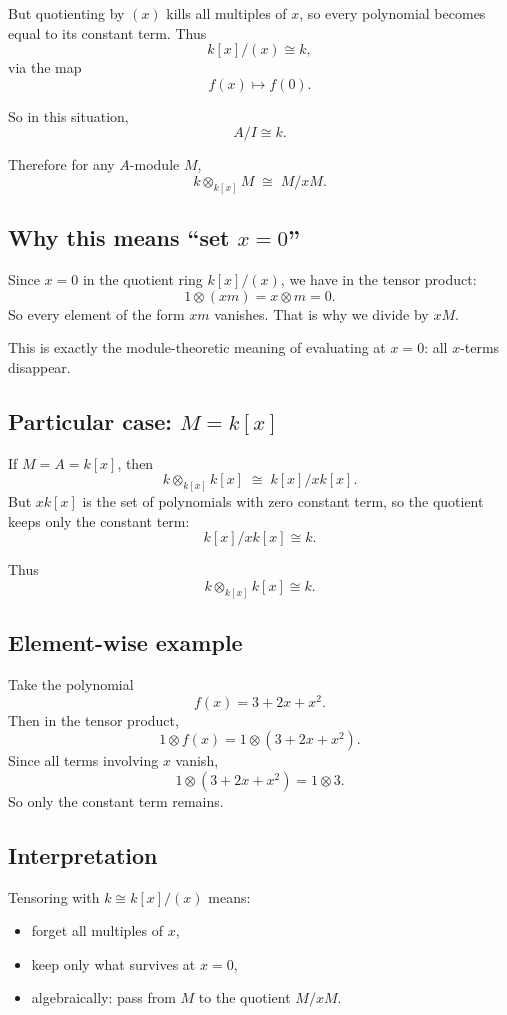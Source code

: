 \documentclass[12pt,a4paper]{article}
\theoremstyle{plain}
\theoremstyle{definition}      %
\begin{document}
	But quotienting by \((x)\) kills all multiples of \(x\), so every polynomial becomes equal to its constant term. Thus
	\[
	k[x]/(x)\cong k,
	\]
	via the map
	\[
	f(x)\longmapsto f(0).
	\]
	
	So in this situation,
	\[
	A/I \cong k.
	\]
	
	Therefore for any \(A\)-module \(M\),
	\[
	k\otimes_{k[x]} M \;\cong\; M/xM.
	\]
	
	\subsection{Why this means ``set \texorpdfstring{$x=0$}{x=0}''}
	
	Since \(x=0\) in the quotient ring \(k[x]/(x)\), we have in the tensor product:
	\[
	1\otimes (xm)=x\otimes m=0.
	\]
	So every element of the form \(xm\) vanishes. That is why we divide by \(xM\).
	
	This is exactly the module-theoretic meaning of evaluating at \(x=0\): all \(x\)-terms disappear.
	
	\subsection{Particular case: \texorpdfstring{$M=k[x]$}{M=k[x]}}
	
	If \(M=A=k[x]\), then
	\[
	k\otimes_{k[x]} k[x]
	\;\cong\;
	k[x]/xk[x].
	\]
	But \(xk[x]\) is the set of polynomials with zero constant term, so the quotient keeps only the constant term:
	\[
	k[x]/xk[x] \cong k.
	\]
	
	Thus
	\[
	k\otimes_{k[x]}k[x]\cong k.
	\]
	
	\subsection{Element-wise example}
	
	Take the polynomial
	\[
	f(x)=3+2x+x^2.
	\]
	Then in the tensor product,
	\[
	1\otimes f(x)
	=
	1\otimes (3+2x+x^2).
	\]
	Since all terms involving \(x\) vanish,
	\[
	1\otimes (3+2x+x^2)=1\otimes 3.
	\]
	So only the constant term remains.
	
	\subsection{Interpretation}
	
	Tensoring with \(k\cong k[x]/(x)\) means:
	\begin{itemize}
		\item forget all multiples of \(x\),
		\item keep only what survives at \(x=0\),
		\item algebraically: pass from \(M\) to the quotient \(M/xM\).
	\end{itemize}
	
\end{document}
